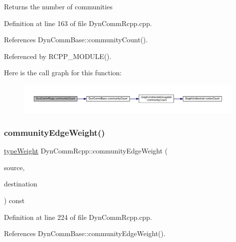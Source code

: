 \begin{DoxyReturn}{Returns}
the number of communities 
\end{DoxyReturn}


Definition at line 163 of file Dyn\+Comm\+Rcpp.\+cpp.



References Dyn\+Comm\+Base\+::community\+Count().



Referenced by R\+C\+P\+P\+\_\+\+M\+O\+D\+U\+L\+E().

Here is the call graph for this function\+:
\nopagebreak
\begin{figure}[H]
\begin{center}
\leavevmode
\includegraphics[width=350pt]{classDynCommRcpp_a67948d5821c2ccffc4dbf47bac6fba70_cgraph}
\end{center}
\end{figure}
\mbox{\label{classDynCommRcpp_ad74a2abe244e62d9df2b98aeea0d3155}} 
\subsubsection{\texorpdfstring{community\+Edge\+Weight()}{communityEdgeWeight()}}
{\footnotesize\ttfamily \hyperlink{edge_8h_a2e7ea3be891ac8b52f749ec73fee6dd2}{type\+Weight} Dyn\+Comm\+Rcpp\+::community\+Edge\+Weight (\begin{DoxyParamCaption}\item[{\hyperlink{graphUndirectedGroupable_8h_a914da95c9ea7f14f4b7f875c36818556}{type\+Community}}]{source,  }\item[{\hyperlink{graphUndirectedGroupable_8h_a914da95c9ea7f14f4b7f875c36818556}{type\+Community}}]{destination }\end{DoxyParamCaption}) const\hspace{0.3cm}{\ttfamily [inline]}}



Definition at line 224 of file Dyn\+Comm\+Rcpp.\+cpp.



References Dyn\+Comm\+Base\+::community\+Edge\+Weight().



